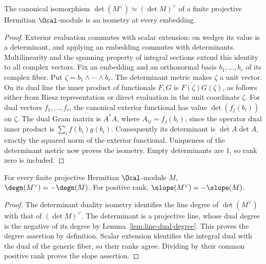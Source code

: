 \begin{lemma}
\label{lem:determinant-dual-isometry}
\leanok
The canonical isomorphism $\det(M^\vee)\simeq(\det M)^\vee$ of a finite
projective Hermitian $\Ocal$-module is an isometry at every embedding.
\end{lemma}
\begin{proof}
Exterior evaluation commutes with scalar extension: on wedges its value is
a determinant, and applying an embedding commutes with determinants.
Multilinearity and the spanning property of integral sections extend this
identity to all complex vectors. Fix an embedding and an orthonormal basis
$b_1,\ldots,b_r$ of its complex fiber. Put $\zeta=b_1\wedge\cdots\wedge b_r$.
The determinant metric makes $\zeta$ a unit vector. On its dual line the
inner product of functionals $F,G$ is $\overline{F(\zeta)}G(\zeta)$,
as follows either from Riesz representation or direct evaluation in the
unit coordinate $\zeta$. For dual vectors $f_1,\ldots,f_r$, the canonical
exterior functional has value $\det(f_j(b_i))$ on $\zeta$.
The dual Gram matrix is $A^*A$, where $A_{ij}=f_j(b_i)$, since the operator
dual inner product is $\sum_i\overline{f(b_i)}g(b_i)$.
Consequently its determinant is $\overline{\det A}\det A$, exactly the
squared norm of the exterior functional. Uniqueness of the determinant
metric now proves the isometry. Empty determinants are $1$, so rank zero
is included.
\end{proof}

\begin{lemma}
\label{lem:dual-degree}
\leanok
For every finite projective Hermitian $\Ocal$-module $M$,
$\degn(M^\vee)=-\degn(M)$. For positive rank,
$\slope(M^\vee)=-\slope(M)$.
\end{lemma}
\begin{proof}
The determinant duality isometry identifies the line degree of
$\det(M^\vee)$ with that of $(\det M)^\vee$. The determinant is a projective
line, whose dual degree is the negative of its degree by
Lemma~\ref{lem:line-dual-degree}. This proves the degree assertion by
definition. Scalar extension identifies the integral dual with the dual of
the generic fiber, so their ranks agree. Dividing by their common positive
rank proves the slope assertion.
\end{proof}

